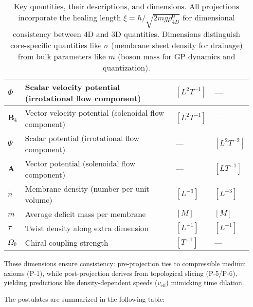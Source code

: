 \begin{table}[H]
\begin{tabularx}{\textwidth}{|l|Y|l|l|}
\hline
$\Phi$ & Scalar velocity potential (irrotational flow component) & $[L^2 T^{-1}]$ & --- \\
\hline
$\mathbf{B}_4$ & Vector velocity potential (solenoidal flow component) & $[L^2 T^{-1}]$ & --- \\
\hline
$\Psi$ & Scalar potential (irrotational flow component) & --- & $[L^2 T^{-2}]$ \\
\hline
$\mathbf{A}$ & Vector potential (solenoidal flow component) & --- & $[L T^{-1}]$ \\
\hline
$\bar{n}$ & Membrane density (number per unit volume) & $[L^{-3}]$ & $[L^{-3}]$ \\
\hline
$\bar{m}$ & Average deficit mass per membrane & $[M]$ & $[M]$ \\
\hline
$\tau$ & Twist density along extra dimension & $[L^{-1}]$ & $[L^{-1}]$ \\
\hline
$\Omega_0$ & Chiral coupling strength & $[T^{-1}]$ & --- \\
\hline
\end{tabularx}
\caption{Key quantities, their descriptions, and dimensions. All projections incorporate the healing length $\xi = \hbar / \sqrt{2 m g \rho_{4D}^0}$ for dimensional consistency between 4D and 3D quantities. Dimensions distinguish core-specific quantities like $\sigma$ (membrane sheet density for drainage) from bulk parameters like $m$ (boson mass for GP dynamics and quantization).}
\label{tab:notation}
\end{table}

These dimensions ensure consistency: pre-projection ties to compressible medium axioms (P-1), while post-projection derives from topological slicing (P-5/P-6), yielding predictions like density-dependent speeds ($v_{\text{eff}}$) mimicking time dilation.

The postulates are summarized in the following table:

